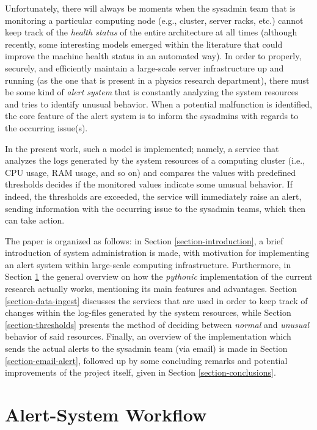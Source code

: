 \documentclass[conference]{IEEEtran}
\begin{document}
\par Unfortunately, there will always be moments when the sysadmin team that is monitoring a particular computing node (e.g., cluster, server racks, etc.) cannot keep track of the \emph{health status} of the entire architecture at all times (although recently, some interesting models emerged within the literature that could improve the machine health status \cite{hasani2019machine,lin2020health} in an automated way). In order to properly, securely, and efficiently maintain a large-scale server infrastructure up and running (as the one that is present in a physics research department), there must be some kind of \emph{alert system} that is constantly analyzing the system resources and tries to identify unusual behavior. When a potential malfunction is identified, the core feature of the alert system is to inform the sysadmins with regards to the occurring issue(s).
\par In the present work, such a model is implemented; namely, a service that analyzes the logs generated by the system resources of a computing cluster (i.e., CPU usage, RAM usage, and so on) and compares the values with predefined thresholds decides if the monitored values indicate some unusual behavior. If indeed, the thresholds are exceeded, the service will immediately raise an alert, sending information with the occurring issue to the sysadmin teams, which then can take action.
\par The paper is organized as follows: in Section \ref{section-introduction}, a brief introduction of system administration is made, with motivation for implementing an alert system within large-scale computing infrastructure. Furthermore, in Section \ref{section-alert-workflow} the general overview on how the \emph{pythonic} implementation of the current research actually works, mentioning its main features and advantages. Section \ref{section-data-ingest} discusses the services that are used in order to keep track of changes within the log-files generated by the system resources, while Section \ref{section-thresholds} presents the method of deciding between \emph{normal} and \emph{unusual} behavior of said resources. Finally, an overview of the implementation which sends the actual alerts to the sysadmin team (via email) is made in Section \ref{section-email-alert}, followed up by some concluding remarks and potential improvements of the project itself, given in Section \ref{section-conclusions}.

\section{Alert-System Workflow}
\label{section-alert-workflow}
\end{document}
